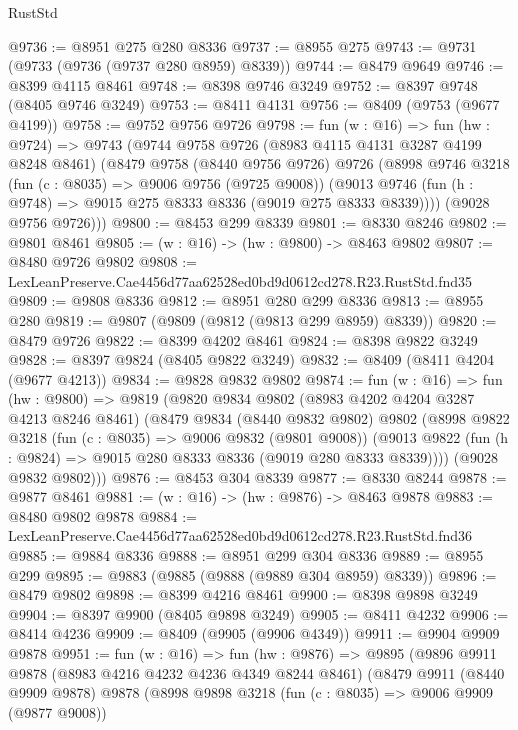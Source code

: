 \begin{lexlean}{RustStd}
\begin{coremodule}
@9736 := @8951 @275 @280 @8336
@9737 := @8955 @275
@9743 := @9731 (@9733 (@9736 (@9737 @280 @8959) @8339))
@9744 := @8479 @9649
@9746 := @8399 @4115 @8461
@9748 := @8398 @9746 @3249
@9752 := @8397 @9748 (@8405 @9746 @3249)
@9753 := @8411 @4131
@9756 := @8409 (@9753 (@9677 @4199))
@9758 := @9752 @9756 @9726
@9798 := fun (w : @16) =>
  fun (hw : @9724) =>
  @9743
    (@9744
      @9758
      @9726
      (@8983 @4115 @4131 @3287 @4199 @8248 @8461)
      (@8479
        @9758
        (@8440 @9756 @9726)
        @9726
        (@8998
          @9746
          @3218
          (fun (c : @8035) => @9006 @9756 (@9725 @9008))
          (@9013 @9746 (fun (h : @9748) => @9015 @275 @8333 @8336 (@9019 @275 @8333 @8339))))
        (@9028 @9756 @9726)))
@9800 := @8453 @299 @8339
@9801 := @8330 @8246
@9802 := @9801 @8461
@9805 := (w : @16) -> (hw : @9800) -> @8463 @9802
@9807 := @8480 @9726 @9802
@9808 := LexLeanPreserve.Cae4456d77aa62528ed0bd9d0612cd278.R23.RustStd.fnd35
@9809 := @9808 @8336
@9812 := @8951 @280 @299 @8336
@9813 := @8955 @280
@9819 := @9807 (@9809 (@9812 (@9813 @299 @8959) @8339))
@9820 := @8479 @9726
@9822 := @8399 @4202 @8461
@9824 := @8398 @9822 @3249
@9828 := @8397 @9824 (@8405 @9822 @3249)
@9832 := @8409 (@8411 @4204 (@9677 @4213))
@9834 := @9828 @9832 @9802
@9874 := fun (w : @16) =>
  fun (hw : @9800) =>
  @9819
    (@9820
      @9834
      @9802
      (@8983 @4202 @4204 @3287 @4213 @8246 @8461)
      (@8479
        @9834
        (@8440 @9832 @9802)
        @9802
        (@8998
          @9822
          @3218
          (fun (c : @8035) => @9006 @9832 (@9801 @9008))
          (@9013 @9822 (fun (h : @9824) => @9015 @280 @8333 @8336 (@9019 @280 @8333 @8339))))
        (@9028 @9832 @9802)))
@9876 := @8453 @304 @8339
@9877 := @8330 @8244
@9878 := @9877 @8461
@9881 := (w : @16) -> (hw : @9876) -> @8463 @9878
@9883 := @8480 @9802 @9878
@9884 := LexLeanPreserve.Cae4456d77aa62528ed0bd9d0612cd278.R23.RustStd.fnd36
@9885 := @9884 @8336
@9888 := @8951 @299 @304 @8336
@9889 := @8955 @299
@9895 := @9883 (@9885 (@9888 (@9889 @304 @8959) @8339))
@9896 := @8479 @9802
@9898 := @8399 @4216 @8461
@9900 := @8398 @9898 @3249
@9904 := @8397 @9900 (@8405 @9898 @3249)
@9905 := @8411 @4232
@9906 := @8414 @4236
@9909 := @8409 (@9905 (@9906 @4349))
@9911 := @9904 @9909 @9878
@9951 := fun (w : @16) =>
  fun (hw : @9876) =>
  @9895
    (@9896
      @9911
      @9878
      (@8983 @4216 @4232 @4236 @4349 @8244 @8461)
      (@8479
        @9911
        (@8440 @9909 @9878)
        @9878
        (@8998
          @9898
          @3218
          (fun (c : @8035) => @9006 @9909 (@9877 @9008))

\end{coremodule}
\end{lexlean}
